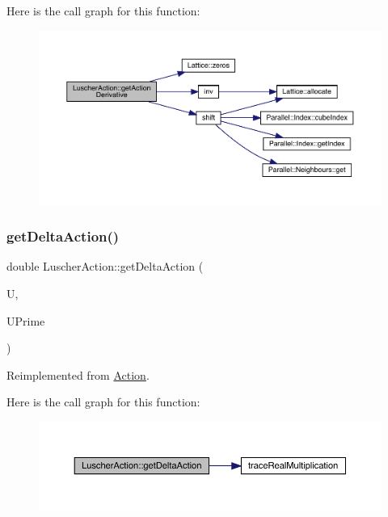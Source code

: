 Here is the call graph for this function\+:\nopagebreak
\begin{figure}[H]
\begin{center}
\leavevmode
\includegraphics[width=350pt]{class_luscher_action_ac11785b2df276816a098a87e6ac514c7_cgraph}
\end{center}
\end{figure}
\mbox{\label{class_luscher_action_a1955f8eea8b0771f6c737c39e3fc11b2}} 
\subsubsection{\texorpdfstring{getDeltaAction()}{getDeltaAction()}}
{\footnotesize\ttfamily double Luscher\+Action\+::get\+Delta\+Action (\begin{DoxyParamCaption}\item[{\mbox{\hyperlink{class_s_u3}{S\+U3}}}]{U,  }\item[{\mbox{\hyperlink{class_s_u3}{S\+U3}}}]{U\+Prime }\end{DoxyParamCaption})\hspace{0.3cm}{\ttfamily [virtual]}}



Reimplemented from \mbox{\hyperlink{class_action_a9409aad86cbfe3b6ec25bf5a837eaea5}{Action}}.

Here is the call graph for this function\+:\nopagebreak
\begin{figure}[H]
\begin{center}
\leavevmode
\includegraphics[width=350pt]{class_luscher_action_a1955f8eea8b0771f6c737c39e3fc11b2_cgraph}
\end{center}
\end{figure}
\mbox{\label{class_luscher_action_a2bfa5f9b8bfb0c4440732000d2281519}} 
